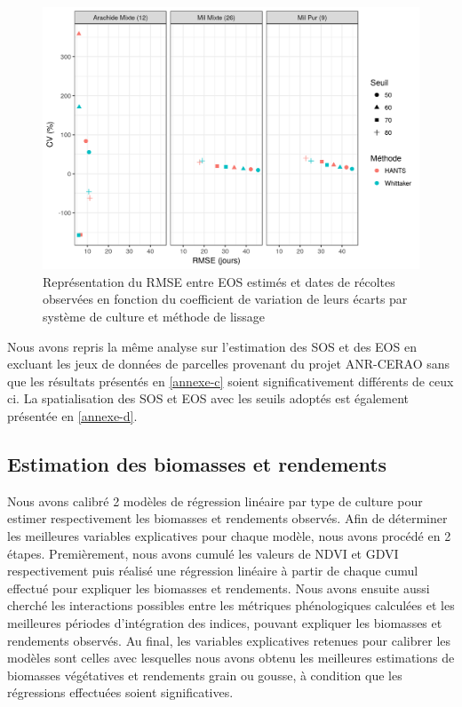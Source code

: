 \begin{figure}[htbp]
 \begin{center}
  \includegraphics[scale=0.7]{resultats_discussions/EOS_RMSE_vs_CV.png} 
 \end{center}
 \caption[EOS -- RMSE vs CV]{Représentation du RMSE entre EOS estimés et dates de récoltes observées en fonction du coefficient de variation de leurs écarts par système de culture et méthode de lissage}
 \label{fig-eos-rmse-cv}
\end{figure}

\newpage 

Nous avons repris la même analyse sur l’estimation des SOS et des EOS en excluant les jeux de données de parcelles provenant du projet ANR-CERAO sans que les résultats présentés en \cref{annexe-c} soient significativement différents de ceux ci. La spatialisation des SOS et EOS avec les seuils adoptés est également présentée en \cref{annexe-d}.

\subsection{Estimation des biomasses et rendements}

Nous avons calibré 2 modèles de régression linéaire par type de culture pour estimer respectivement les biomasses et rendements observés. Afin de déterminer les meilleures variables explicatives pour chaque modèle, nous avons procédé en 2 étapes. Premièrement, nous avons cumulé les valeurs de NDVI et GDVI respectivement puis réalisé une régression linéaire à partir de chaque cumul effectué pour expliquer les biomasses et rendements. Nous avons ensuite aussi cherché les interactions possibles entre les métriques phénologiques calculées et les meilleures périodes d’intégration des indices, pouvant expliquer les biomasses et rendements observés. Au final, les variables explicatives retenues pour calibrer les modèles sont celles avec lesquelles nous avons obtenu les meilleures estimations de biomasses végétatives et rendements grain ou gousse, à condition que les régressions effectuées soient significatives.

